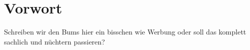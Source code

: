 \chapter*{Vorwort}

Schreiben wir den Bums hier ein bisschen wie Werbung oder soll das komplett sachlich und nüchtern passieren?


